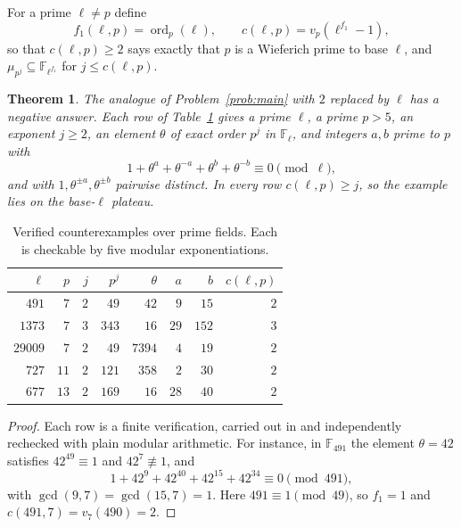 \documentclass[a4paper]{article}
\newtheorem{theorem}{Theorem}[section]
\newcommand{\F}{\mathbb{F}}
\newcommand{\ord}[2][]{\operatorname{ord}_{#1}\!\left(#2\right)}
\begin{document}
For a prime $\ell\ne p$ define
\[
	f_1(\ell,p)=\ord[p]{\ell},
	\qquad
	c(\ell,p)=v_p\!\left(\ell^{f_1}-1\right),
\]
so that $c(\ell,p)\geq2$ says exactly that $p$ is a Wieferich prime to base
$\ell$, and $\mu_{p^{j}}\subseteq\F_{\ell^{f_1}}$ for $j\leq c(\ell,p)$.

\begin{theorem}\label{thm:counterexamples}
	The analogue of Problem~\ref{prob:main} with $2$ replaced by $\ell$ has
	a negative answer.
	Each row of Table~\ref{tab:counterexamples} gives a prime $\ell$, a
	prime $p>5$, an exponent $j\geq2$, an element $\theta$ of exact order
	$p^{j}$ in $\F_{\ell}$, and integers $a,b$ prime to $p$ with
	\[
		1+\theta^{a}+\theta^{-a}+\theta^{b}+\theta^{-b}\equiv0\pmod{\ell},
	\]
	and with $1,\theta^{\pm a},\theta^{\pm b}$ pairwise distinct.
	In every row $c(\ell,p)\geq j$, so the example lies on the base-$\ell$
	plateau.
\end{theorem}

\begin{table}[h]
	\centering
	\begin{tabular}{rrrrrrrr}
		\toprule
		$\ell$ & $p$ & $j$ & $p^j$ & $\theta$ & $a$ & $b$ & $c(\ell,p)$\\
		\midrule
		$491$   & $7$  & $2$ & $49$  & $42$   & $9$  & $15$  & $2$\\
		$1373$  & $7$  & $3$ & $343$ & $16$   & $29$ & $152$ & $3$\\
		$29009$ & $7$  & $2$ & $49$  & $7394$ & $4$  & $19$  & $2$\\
		$727$   & $11$ & $2$ & $121$ & $358$  & $2$  & $30$  & $2$\\
		$677$   & $13$ & $2$ & $169$ & $16$   & $28$ & $40$  & $2$\\
		\bottomrule
	\end{tabular}
	\caption{Verified counterexamples over prime fields.
	Each is checkable by five modular exponentiations.}
	\label{tab:counterexamples}
\end{table}

\begin{proof}
	Each row is a finite verification, carried out in
	 and independently rechecked
	with plain modular arithmetic.
	For instance, in $\F_{491}$ the element $\theta=42$ satisfies
	$42^{49}\equiv1$ and $42^{7}\not\equiv1$, and
	\[
		1+42^{9}+42^{40}+42^{15}+42^{34}\equiv0\pmod{491},
	\]
	with $\gcd(9,7)=\gcd(15,7)=1$.
	Here $491\equiv1\pmod{49}$, so $f_1=1$ and $c(491,7)=v_7(490)=2$.
\end{proof}
\end{document}
